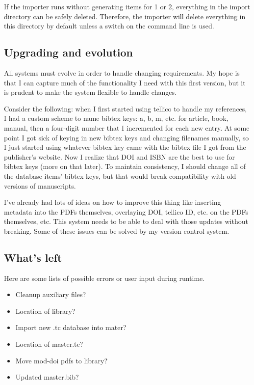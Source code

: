 \documentclass[letterpaper,12pt]{article}
\begin{document}
If the importer runs without generating items for 1 or 2, everything in the import directory can be safely deleted. Therefore, the importer will delete everything in this directory by default unless a switch on the command line is used.

\subsection{Upgrading and evolution}
All systems must evolve in order to handle changing requirements. My hope is that I can capture much of the functionality I need with this first version, but it is prudent to make the system flexible to handle changes.

Consider the following: when I first started using tellico to handle my references, I had a custom scheme to name bibtex keys: a, b, m, etc. for article, book, manual, then a four-digit number that I incremented for each new entry. At some point I got sick of keying in new bibtex keys and changing filenames manually, so I just started using whatever bibtex key came with the bibtex file I got from the publisher's website. Now I realize that DOI and ISBN are the best to use for bibtex keys (more on that later). To maintain consistency, I should change all of the database items' bibtex keys, but that would break compatibility with old versions of manuscripts.

I've already had lots of ideas on how to improve this thing like inserting metadata into the PDFs themselves, overlaying DOI, tellico ID, etc. on the PDFs themselves, etc. This system needs to be able to deal with those updates without breaking. Some of these issues can be solved by my version control system.





\subsection{What's left}
Here are some lists of possible errors or user input during runtime.

\begin{itemize}
\item Cleanup auxiliary files?
\item Location of library?
\item Import new .tc database into mater?
\item Location of master.tc?
\item Move mod-doi pdfs to library?
\item Updated master.bib?
\end{itemize}
\end{document}
